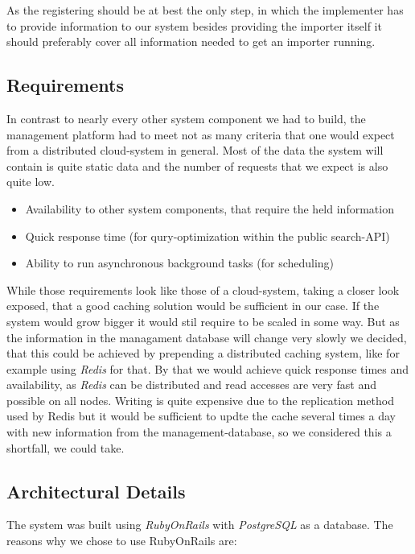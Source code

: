 As the registering should be at best the only step, in which the
implementer has to provide information to our system besides providing
the importer itself it should preferably cover all information needed to
get an importer running.

\subsection{Requirements}\label{requirements}

In contrast to nearly every other system component we had to build, the
management platform had to meet not as many criteria that one would
expect from a distributed cloud-system in general. Most of the data the
system will contain is quite static data and the number of requests that
we expect is also quite low.

\begin{itemize}
	\item
	Availability to other system components, that require the held
	information
	\item
	Quick response time (for qury-optimization within the public
	search-API)
	\item
	Ability to run asynchronous background tasks (for scheduling)
\end{itemize}

While those requirements look like those of a cloud-system, taking a
closer look exposed, that a good caching solution would be sufficient in
our case. If the system would grow bigger it would stil require to be
scaled in some way. But as the information in the managament database
will change very slowly we decided, that this could be achieved by
prepending a distributed caching system, like for example using
\emph{Redis} for that. By that we would achieve quick response times and
availability, as \emph{Redis} can be distributed and read accesses are
very fast and possible on all nodes. Writing is quite expensive due to
the replication method used by Redis but it would be sufficient to updte
the cache several times a day with new information from the
management-database, so we considered this a shortfall, we could take.

\subsection{Architectural Details}\label{architectural-details}

The system was built using \emph{RubyOnRails} with \emph{PostgreSQL} as
a database. The reasons why we chose to use RubyOnRails are:

